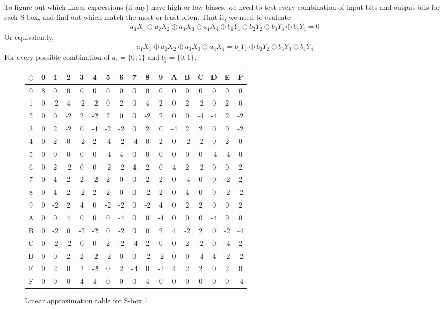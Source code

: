 \documentclass[12pt, a4paper, draft]{report}
\begin{document}
To figure out which linear expressions (if any) have high or low biases, we need
to test every combination of input bits and output bits for each S-box, and
find out which match the most or least often. That is, we need to evaluate
\begin{align*}
    a_1X_1 \oplus a_2X_2 \oplus a_3X_3 \oplus a_4X_4 \oplus
    b_1Y_1 \oplus b_2Y_2 \oplus b_3Y_3 \oplus b_4Y_4 = 0
\end{align*}
Or equivalently,
\begin{align*}
    a_1X_1 \oplus a_2X_2 \oplus a_3X_3 \oplus a_4X_4 =
    b_1Y_1 \oplus b_2Y_2 \oplus b_3Y_3 \oplus b_4Y_4
\end{align*}
For every possible combination of $a_i = \{0, 1\}$ and $b_j = \{0, 1\}$.

\begin{figure}[h]
\begin{center}
\begin{tabular}{c|*{16}{c}}
$\oplus$& 0& 1& 2& 3& 4& 5& 6& 7& 8& 9& A& B& C& D& E& F\\
\midrule
0& 8& 0& 0& 0& 0& 0& 0& 0& 0& 0& 0& 0& 0& 0& 0& 0\\
1& 0&-2& 4&-2&-2& 0& 2& 0& 4& 2& 0& 2&-2& 0& 2& 0\\
2& 0& 0&-2& 2&-2& 2& 0& 0&-2& 2& 0& 0&-4&-4& 2&-2\\
3& 0& 2&-2& 0&-4&-2&-2& 0& 2& 0&-4& 2& 2& 0& 0&-2\\
4& 0& 2& 0&-2& 2&-4&-2&-4& 0& 2& 0&-2&-2& 0& 2& 0\\
5& 0& 0& 0& 0& 0&-4& 4& 0& 0& 0& 0& 0& 0&-4&-4& 0\\
6& 0& 2&-2& 0& 0&-2&-2& 4& 2& 0& 4& 2&-2& 0& 0& 2\\
7& 0& 4& 2& 2&-2& 2& 0& 0& 2& 2& 0&-4& 0& 0&-2& 2\\
8& 0& 4& 2&-2& 2& 2& 0& 0&-2& 2& 0& 4& 0& 0&-2&-2\\
9& 0&-2& 2& 4& 0&-2&-2& 0&-2& 4& 0& 2& 2& 0& 0& 2\\
A& 0& 0& 4& 0& 0& 0&-4& 0& 0&-4& 0& 0& 0&-4& 0& 0\\
B& 0&-2& 0&-2&-2& 0&-2& 0& 0& 2& 4&-2& 2& 0&-2&-4\\
C& 0&-2&-2& 0& 0& 2&-2&-4& 2& 0& 0& 2&-2& 0&-4& 2\\
D& 0& 0& 2& 2&-2&-2& 0& 0&-2&-2& 0& 0&-4& 4&-2&-2\\
E& 0& 2& 0& 2&-2& 0& 2&-4& 0&-2& 4& 2& 2& 0& 2& 0\\
F& 0& 0& 0& 4& 4& 0& 0& 0& 4& 0& 0& 0& 0& 0& 0&-4\\
\end{tabular}
\end{center}
\caption{Linear approximation table for S-box 1}
\end{figure}
\end{document}
